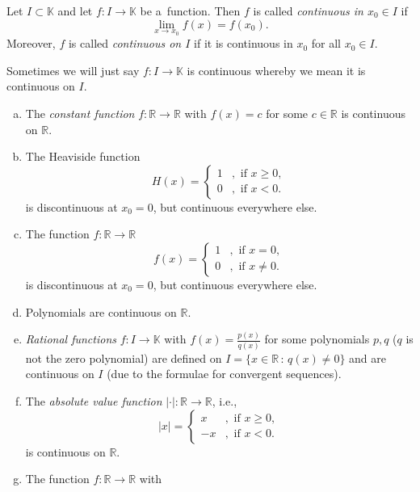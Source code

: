 

\begin{Definition}[Continuity]
Let $I\subset\mathbb{K}$ and let $f:I\to\mathbb{K}$ be a~function. Then $f$ is called \emph{ continuous in $x_0\in I$} if
\[\lim_{x\to x_0}f(x)=f(x_0).\]
Moreover, $f$ is called \emph{continuous on $I$} if it is continuous in $x_0$ for all $x_0\in I$.
\end{Definition}
\begin{Remark}{}
Sometimes we will just say $f:I\to\mathbb{K}$ is continuous whereby we mean it is continuous on $I$.
\end{Remark}

\begin{example}
\begin{enumerate}[a)]
 \item The {\em constant function} $f:\mathbb{R}\to\mathbb{R}$ with $f(x)=c$ for some $c\in\mathbb{R}$ is continuous on $\mathbb{R}$.
 \whiteskipsmall
 \item The Heaviside function 
\[H(x)=\begin{cases}1&,\text{ if }x\geq 0,\\0&,\text{ if }x<0.\end{cases}\]
 is discontinuous at $x_0=0$, but continuous everywhere else.
  \whiteskipsmall
 \item The function $f:\mathbb{R}\to\mathbb{R}$ 
\[f(x)=\begin{cases}1&,\text{ if }x= 0,\\0&,\text{ if }x\neq0.\end{cases}\]
 is discontinuous at $x_0=0$, but continuous everywhere else.
  \whiteskipsmall
 \item Polynomials are continuous on $\mathbb{R}$.
   \whiteskipsmall
 \item {\em Rational functions} $f:I\to\mathbb{K}$ with $f(x)=\frac{p(x)}{q(x)}$ for some polynomials $p,q$ ($q$ is not the zero polynomial) are defined on $I=\{x\in\mathbb{R}\,:\,q(x)\neq0\}$ and are continuous
on $I$ (due to the formulae for convergent sequences).
	 \whiteskipsmall
 \item The {\em absolute value function} $|\cdot|:\mathbb{R}\to\mathbb{R}$, i.e.,
\[|x|=\begin{cases}x&,\text{ if }x\geq 0,\\-x&,\text{ if }x<0.\end{cases}\]
 is continuous on $\mathbb{R}$.
 	  \whiteskipsmall
 \item The function $f:\mathbb{R}\to\mathbb{R}$ with

\end{enumerate}
\end{example}
